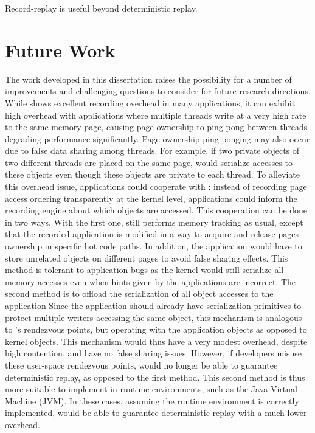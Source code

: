 Record-replay is useful beyond deterministic replay.

\section{Future Work}

The work developed in this dissertation raises the possibility for a number of
improvements and challenging questions to consider for future research
directions.
While \scribe shows excellent recording overhead in many applications, it can
exhibit high overhead with applications where multiple threads write at a
very high rate to the same memory page, causing page ownership to ping-pong
between threads degrading performance significantly.
Page ownership ping-ponging may also occur due to false data sharing among
threads. For example, if two private objects of two different threads are placed
on the same page, \scribe would serialize accesses to these objects even though
these objects are private to each thread.
To alleviate this overhead issue, applications could cooperate with \scribe: instead
of recording page access ordering transparently at the kernel level,
applications could inform the recording engine about which objects are accessed.
This cooperation can be done in two ways. With the first one,
\scribe still performs memory tracking as usual, except that the recorded
application is modified in a way to acquire and release pages ownership in
specific hot code paths. In addition, the application would have to store
unrelated objects on different pages to avoid false sharing effects.
This method is tolerant to application bugs as the kernel would still serialize
all memory accesses even when hints given by the applications are incorrect.
The second method is to offload the serialization of all object accesses to the application
Since the application should already have serialization primitives to protect
multiple writers accessing the same object, this mechanism is analogous to
\scribe's rendezvous points, but operating with the application objects as
opposed to kernel objects. This mechanism would thus have a very modest overhead,
despite high contention, and have no false sharing issues.
However, if developers misuse these user-space
rendezvous points, \scribe would no longer be able to guarantee deterministic
replay, as opposed to the first method. This second method is thus more suitable
to implement in runtime environments, such as the Java Virtual Machine (JVM).  In
these cases, assuming the runtime environment is correctly implemented, \scribe
would be able to guarantee deterministic replay with a much lower overhead.

